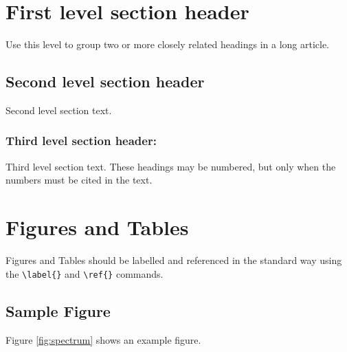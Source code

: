 \documentclass[9pt,twocolumn,twoside]{gsajnl}
\begin{document}
\section{First level section header}

Use this level to group two or more closely related headings in a long article.

\subsection{Second level section header}

Second level section text.

\subsubsection{Third level section header:}

Third level section text. These headings may be numbered, but only when the numbers must be cited in the text. 

\section{Figures and Tables}

Figures and Tables should be labelled and referenced in the standard way using the \verb|\label{}| and \verb|\ref{}| commands.

\subsection{Sample Figure}

Figure \ref{fig:spectrum} shows an example figure.
\end{document}
